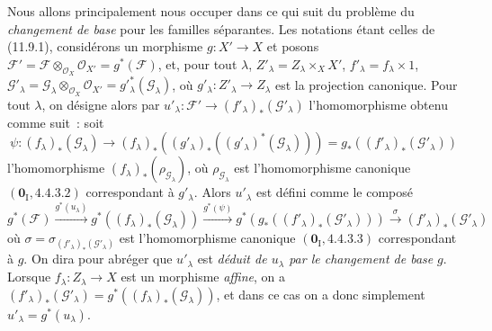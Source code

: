 \begin{env}[11.9.5]
\label{IV.11.9.5-fr}
Nous allons principalement nous occuper dans ce qui suit du problème du
\emph{changement de base} pour les familles séparantes. Les notations étant
celles de (11.9.1), considérons un morphisme $g:X'\to X$ et posons
$\mathcal F'=\mathcal F\otimes_{\mathcal O_X}\mathcal O_{X'}
=g^*(\mathcal F)$, et, pour tout $\lambda$,
$Z'_\lambda=Z_\lambda\times_X X'$, $f'_\lambda=f_\lambda\times 1$,
$\mathcal G'_\lambda=\mathcal G_\lambda\otimes_{\mathcal O_X}
\mathcal O_{X'}=g'^*_\lambda(\mathcal G_\lambda)$, où
$g'_\lambda:Z'_\lambda\to Z_\lambda$ est la projection canonique. Pour tout
$\lambda$, on désigne alors par
$u'_\lambda:\mathcal F'\to(f'_\lambda)_*(\mathcal G'_\lambda)$
l'homomorphisme obtenu comme suit~: soit
\[
\psi:(f_\lambda)_*(\mathcal G_\lambda)\longrightarrow
(f_\lambda)_*((g'_\lambda)_*((g'_\lambda)^*(\mathcal G_\lambda)))
=g_*((f'_\lambda)_*(\mathcal G'_\lambda))
\]
l'homomorphisme $(f_\lambda)_*(\rho_{\mathcal G_\lambda})$, où
$\rho_{\mathcal G_\lambda}$ est l'homomorphisme canonique
$(\mathbf 0_{\mathrm I},4.4.3.2)$ correspondant à $g'_\lambda$. Alors
$u'_\lambda$ est défini comme le composé
\[
g^*(\mathcal F)\xrightarrow{g^*(u_\lambda)}
g^*((f_\lambda)_*(\mathcal G_\lambda))
\xrightarrow{g^*(\psi)}g^*(g_*((f'_\lambda)_*(\mathcal G'_\lambda)))
\xrightarrow{\sigma}(f'_\lambda)_*(\mathcal G'_\lambda)
\]
où $\sigma=\sigma_{(f'_\lambda)_*(\mathcal G'_\lambda)}$ est
l'homomorphisme canonique $(\mathbf 0_{\mathrm I},4.4.3.3)$ correspondant à
$g$. On dira pour abréger que $u'_\lambda$ est \emph{déduit de $u_\lambda$
par le changement de base} $g$. Lorsque $f_\lambda:Z_\lambda\to X$ est un
morphisme \emph{affine}, on a
$(f'_\lambda)_*(\mathcal G'_\lambda)=g^*((f_\lambda)_*(\mathcal G_\lambda))$,
et dans ce cas on a donc simplement $u'_\lambda=g^*(u_\lambda)$.


\end{env}
